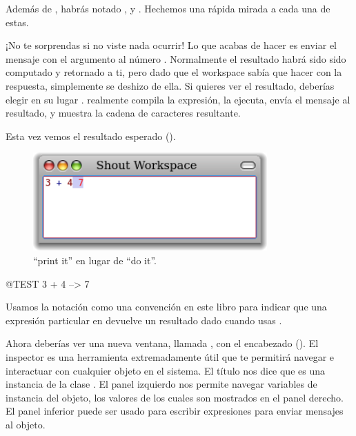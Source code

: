\documentclass[a4paper,10pt,twoside]{book}
\begin{document}

Adem\'as de , habr\'as notado ,  y . Hechemos una r\'apida mirada a cada una de estas.


¡No te sorprendas si no viste nada ocurrir! Lo que acabas de hacer es enviar el mensaje \ct{+} con el argumento  al n\'umero . Normalmente el resultado  habr\'a sido sido computado y retornado a ti, pero dado que el workspace sab\'ia que hacer con la respuesta, simplemente se deshizo de ella. Si quieres ver el resultado, deber\'ias elegir en su lugar .  realmente compila la expresi\'on, la ejecuta, env\'ia el mensaje  al resultado, y muestra la cadena de caracteres resultante.

Esta vez vemos el resultado esperado ().

\begin{figure}[htb]
\centerline {\includegraphics[width=0.8\textwidth]{PrintIt}}
\caption{``print it'' en lugar de ``do it''. }
\end{figure}

\begin{code}{@TEST}
3 + 4 --> 7
\end{code}
\noindent
Usamos la notaci\'on \ct{-->} como una convenci\'on en este libro para indicar que una expresi\'on particular en \pharo devuelve un resultado dado cuando usas .

\noindent
Ahora deber\'ias ver una nueva ventana, llamada , con el encabezado  ().
El inspector es una herramienta extremadamente \'util que te permitir\'a navegar e interactuar con cualquier objeto en el sistema.
El t\'itulo nos dice que  es una instancia de la clase .
El panel izquierdo nos permite navegar variables de instancia del objeto, los valores de los cuales son mostrados en el panel derecho.
El panel inferior puede ser usado para escribir expresiones para enviar mensajes al objeto.
\end{document}
